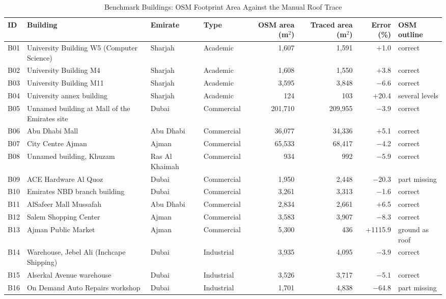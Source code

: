 \begin{table}[t]
\centering
\caption{Benchmark Buildings: OSM Footprint Area Against the Manual Roof Trace}
\label{tab:buildings}
\footnotesize
\setlength{\tabcolsep}{3.5pt}
\begin{tabular}{llllrrrl}
\toprule
ID & Building & Emirate & Type & OSM area (m$^2$) & Traced area (m$^2$) & Error (\%) & OSM outline \\
\midrule
B01 & University Building W5 (Computer Science) & Sharjah & Academic & 1,607 & 1,591 & $+$1.0 & correct \\
B02 & University Building M4 & Sharjah & Academic & 1,608 & 1,550 & $+$3.8 & correct \\
B03 & University Building M11 & Sharjah & Academic & 3,595 & 3,848 & $-$6.6 & correct \\
\rowcolor{black!8}B04 & University annex building & Sharjah & Academic & 124 & 103 & $+$20.4 & several levels \\
B05 & Unnamed building at Mall of the Emirates site & Dubai & Commercial & 201,710 & 209,955 & $-$3.9 & correct \\
B06 & Abu Dhabi Mall & Abu Dhabi & Commercial & 36,077 & 34,336 & $+$5.1 & correct \\
B07 & City Centre Ajman & Ajman & Commercial & 65,533 & 68,417 & $-$4.2 & correct \\
B08 & Unnamed building, Khuzam & Ras Al Khaimah & Commercial & 934 & 992 & $-$5.9 & correct \\
\rowcolor{black!8}B09 & ACE Hardware Al Quoz & Dubai & Commercial & 1,950 & 2,448 & $-$20.3 & part missing \\
B10 & Emirates NBD branch building & Dubai & Commercial & 3,261 & 3,313 & $-$1.6 & correct \\
B11 & AlSafeer Mall Mussafah & Abu Dhabi & Commercial & 2,834 & 2,661 & $+$6.5 & correct \\
B12 & Salem Shopping Center & Ajman & Commercial & 3,583 & 3,907 & $-$8.3 & correct \\
\rowcolor{black!8}B13 & Ajman Public Market & Ajman & Commercial & 5,300 & 436 & $+$1115.9 & ground as roof \\
B14 & Warehouse, Jebel Ali (Inchcape Shipping) & Dubai & Industrial & 3,935 & 4,095 & $-$3.9 & correct \\
B15 & Alserkal Avenue warehouse & Dubai & Industrial & 3,526 & 3,717 & $-$5.1 & correct \\
\rowcolor{black!8}B16 & On Demand Auto Repairs workshop & Dubai & Industrial & 1,701 & 4,838 & $-$64.8 & part missing \\

\end{tabular}
\end{table}
